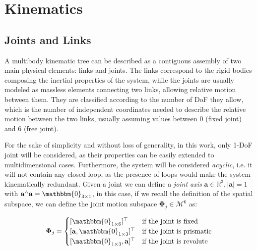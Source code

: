 \section{Kinematics }

\subsection{Joints and Links}

A multibody kinematic tree can be described as a contiguous assembly of two main physical elements: links and joints. The links correspond to the rigid bodies composing the inertial properties of the system, while the joints are usually modeled as massless elements connecting two links, allowing relative motion between them. They are classified according to the number of \ac{DoF} they allow, which is the number of independent coordinates needed to describe the relative motion between the two links, usually assuming values between 0 (fixed joint) and 6 (free joint).

For the sake of simplicity and without loss of generality, in this work, only 1-\ac{DoF} joint will be considered, as their properties can be easily extended to multidimensional cases. Furthermore, the system will be considered \textit{acyclic}, i.e. it will not contain any closed loop, as the presence of loops would make the system kinematically redundant.
Given a joint we can define a \textit{joint axis} $\mathbf{a} \in \mathbb{R}^3, |\mathbf{a}| = 1$ with $\mathbf{a}^\wedge \mathbf{a} = \mathbbm{0}_{3 \times 1}$, in this case, if we recall the definition of the spatial subspace, we can define the joint motion subspace $\boldsymbol{\Phi} _j \in \mathcal{M} ^6$ as:

\begin{equation}
    \boldsymbol{\Phi} _j =
    \begin{cases}
        [\mathbbm{0}_{1 \times 6}] ^\top             & \text{if the joint is fixed}     \\
        [\mathbf{a}, \mathbbm{0}_{1 \times 3}] ^\top & \text{if the joint is prismatic} \\
        [\mathbbm{0}_{1 \times 3}, \mathbf{a}] ^\top & \text{if the joint is revolute}
    \end{cases}
\end{equation}

